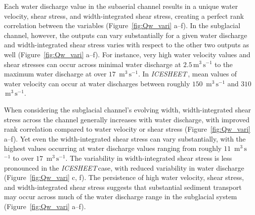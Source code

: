 \documentclass[draft]{agujournal2019}
\newcommand{\icesheet}{\textit{ICESHEET}\,}
\newcommand{\unit}[1]{$\mathrm{#1}$}
\begin{document}
Each water discharge value in the subaerial channel results in a unique water velocity, shear stress, and width-integrated shear stress, creating a perfect rank correlation between the variables (Figure~\ref{fig:Qw_vari} a--f).
In the subglacial channel, however,  the outputs can vary substantially for a given water discharge and width-integrated shear stress varies with respect to the other two  outputs as well (Figure~\ref{fig:Qw_vari} a--f).
For instance, very high  water velocity values and shear stresses can occur across minimal water discharge at $2.5$\,\unit{m}$^3$\,\unit{s}$^{-1}$ to the maximum water discharge at over $17$ \,\unit{m}$^3$\,\unit{s}$^{-1}$.
In \icesheet, mean values of water velocity can occur at water discharges between roughly $150$ \,\unit{m}$^3$\,\unit{s}$^{-1}$ and $310$ \,\unit{m}$^3$\,\unit{s}$^{-1}$.

When considering the subglacial channel's evolving width, width-integrated shear stress  across the channel generally increases with water discharge, with improved rank correlation compared to water velocity or shear stress (Figure~\ref{fig:Qw_vari} a--f).
Yet even the width-integrated shear stress  can vary substantially, with the highest values occurring at water discharge values ranging from roughly $11$ \,\unit{m}$^3$\,\unit{s}$^{-1}$ to over $17$ \,\unit{m}$^3$\,\unit{s}$^{-1}$.
The variability in width-integrated shear stress is less pronounced in the \icesheet case, with reduced variability in water discharge (Figure~\ref{fig:Qw_vari} c, f).
The persistence of high water velocity, shear stress, and width-integrated shear stress suggests that substantial sediment transport may occur across much of the water discharge range in the subglacial system (Figure~\ref{fig:Qw_vari} a--f).
\end{document}
